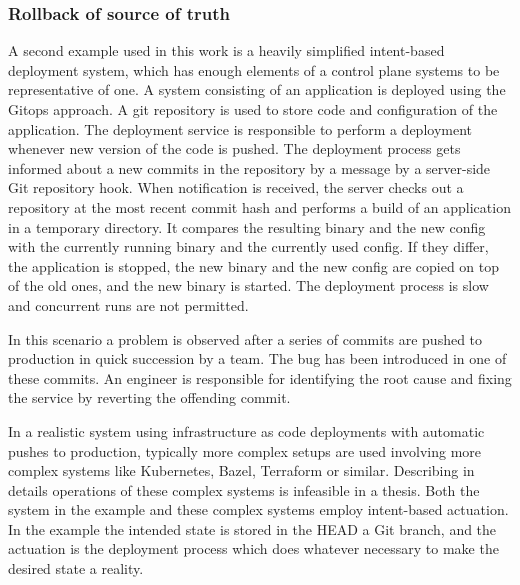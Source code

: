 \subsubsection{Rollback of source of truth}\label{sec:motivating-ex2}

A second example used in this work is a heavily simplified intent-based deployment system, which has enough elements of a control plane systems to be representative of one. A system consisting of an application is deployed using the Gitops approach\cite{gitops-limoncelli2018}. A git repository is used to store code and configuration of the application. The deployment service is responsible to perform a deployment whenever new version of the code is pushed. The deployment process gets informed about a new commits in the repository by a message by a server-side Git repository hook. When notification is received, the server checks out a repository at the most recent commit hash and performs a build of an application in a temporary directory. It compares the resulting binary and the new config with the currently running binary and the currently used config. If they differ, the application is stopped, the new binary and the new config are copied on top of the old ones, and the new binary is started. The deployment process is slow and concurrent runs are not permitted.

In this scenario a problem is observed after a series of commits are pushed to production in quick succession by a team. The bug has been introduced in one of these commits. An engineer is responsible for identifying the root cause and fixing the service by reverting the offending commit.

In a realistic system using infrastructure as code deployments with automatic pushes to production, typically more complex setups are used involving more complex systems like Kubernetes, Bazel, Terraform or similar. Describing in details operations of these complex systems is infeasible in a thesis. Both the system in the example and these complex systems employ intent-based actuation. In the example the intended state is stored in the HEAD a Git branch, and the actuation is the deployment process which does whatever necessary to make the desired state a reality.

\begin{comment}
BRAK czasu, ale

TODO: Use intent-based actuation of a simple object (one coalescing). Example of a system using intent-based actuation, where a bunch of desired state updates were sent quickly and it brought the system down. Engineer was playing with `kubectl apply` repeatedly.

\end{comment}

